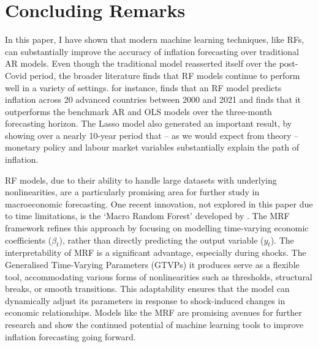 \section{Concluding Remarks} \label{sec:conc}

In this paper, I have shown that modern machine learning techniques, like RFs, can substantially improve the accuracy of inflation forecasting over traditional AR models. Even though the traditional model reasserted itself over the post-Covid period, the broader literature finds that RF models continue to perform well in a variety of settings. \textcite{Kohlscheen2021WhatInflation} for instance, finds that an RF model predicts inflation across 20 advanced countries between 2000 and 2021 and finds that it outperforms the benchmark AR and OLS models over the three-month forecasting horizon. The Lasso model also generated an important result, by showing over a nearly 10-year period that -- as we would expect from theory -- monetary policy and labour market variables substantially explain the path of inflation. 

RF models, due to their ability to handle large datasets with underlying nonlinearities, are a particularly promising area for further study in macroeconomic forecasting. One recent innovation, not explored in this paper due to time limitations, is the `Macro Random Forest' developed by \textcite{GouletCoulombe2024TheForest}. The MRF framework refines this approach by focusing on modelling time-varying economic coefficients ($\beta_t$), rather than directly predicting the output variable ($y_t$). The interpretability of MRF is a significant advantage, especially during shocks. The Generalised Time-Varying Parameters (GTVPs) it produces serve as a flexible tool, accommodating various forms of nonlinearities such as thresholds, structural breaks, or smooth transitions. This adaptability ensures that the model can dynamically adjust its parameters in response to shock-induced changes in economic relationships. Models like the MRF are promising avenues for further research and show the continued potential of machine learning tools to improve inflation forecasting going forward. 

